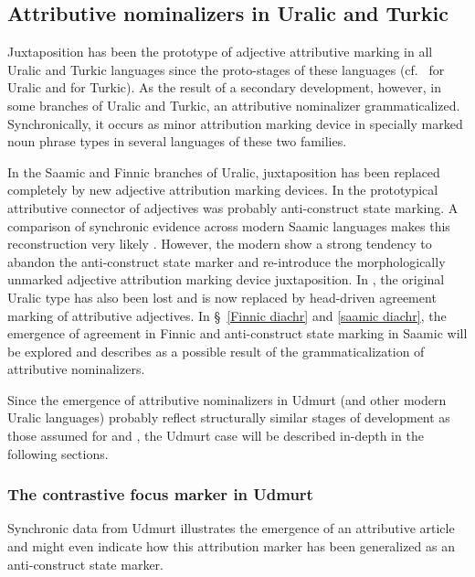 \subsection{Attributive nominalizers in Uralic and Turkic}\label{uralic-turkic diachr}
Juxtaposition has been the prototype of adjective attributive marking in all Uralic and Turkic languages since the proto-stages of these languages (cf.~\citealt[80–81]{decsy1990} for Uralic and \citealt[75–76]{decsy1998} for Turkic). As the result of a secondary development, however, in some branches of Uralic and Turkic, an attributive nominalizer grammaticalized. Synchronically, it occurs as minor attribution marking device in specially marked noun phrase types in several languages of these two families.%

In the Saamic and Finnic branches of Uralic, juxtaposition has been replaced completely by new adjective attribution marking devices. In  the prototypical attributive connector of adjectives was probably anti-construct state marking. A comparison of synchronic evidence across modern Saamic languages makes this reconstruction very likely \citep{riesler2006b}. However, the modern  show a strong tendency to abandon the anti-construct state marker and re-introduce the morphologically unmarked adjective attribution marking device juxtaposition. In , the original Uralic type has also been lost and is now replaced by head\hyp{}driven agreement marking of attributive adjectives. In \S~\ref{Finnic diachr} and \ref{saamic diachr}, the emergence of agreement in Finnic and anti-construct state marking in Saamic will be explored and describes as a possible result of the grammaticalization of attributive nominalizers. 

Since the emergence of attributive nominalizers in Udmurt (and other modern Uralic languages) probably reflect structurally similar stages of development as those assumed for  and , the Udmurt case will be described in-depth in the following sections.

\subsubsection{The contrastive focus marker in Udmurt} \label{udmurt diachr}
Synchronic data from Udmurt illustrates the emergence of an attributive article and might even indicate how this attribution marker has been generalized as an anti-construct state marker. 

